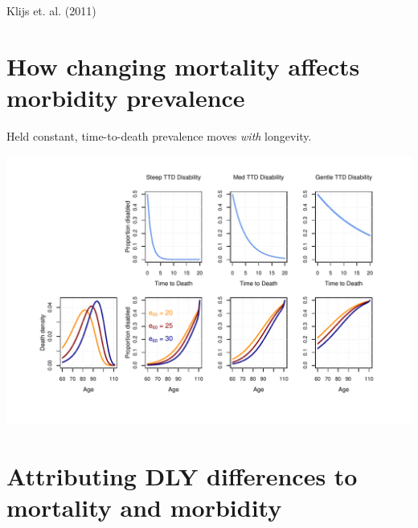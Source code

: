 \documentclass[20pt]{beamer}
\begin{document}
\begin{frame}[plain]
\begin{center}
\end{center}
Klijs et. al. (2011)
\end{frame}

\section{How changing mortality affects morbidity prevalence}
\begin{frame}[plain]
\Large
\begin{center}
Held constant, time-to-death prevalence moves \emph{with} longevity.
\end{center}
\end{frame}
\begin{frame}[plain]
\includegraphics[trim=1cm 0 0 0, clip,
width=1.1\linewidth]{Figures/schematic_pres.pdf}
\end{frame}

\section{Attributing DLY differences to mortality and morbidity}
\end{document}

